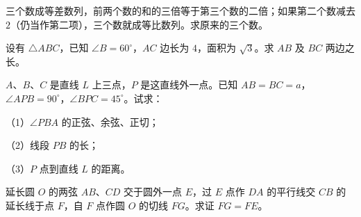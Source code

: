 \begin{question}
三个数成等差数列，前两个数的和的三倍等于第三个数的二倍；如果第二个数减去 $2$（仍当作第二项），三个数就成等比数列。求原来的三个数。

\end{question}
\begin{question}
设有 $\triangle ABC$，已知 $\angle B=60^\circ$，$AC$ 边长为 $4$，面积为 $\sqrt3$。求 $AB$ 及 $BC$ 两边之长。

\end{question}
\begin{question}
$A$、$B$、$C$ 是直线 $L$ 上三点，$P$ 是这直线外一点。已知 $AB=BC=a$，$\angle APB=90^\circ$，$\angle BPC=45^\circ$。试求：

（1）$\angle PBA$ 的正弦、余弦、正切；

（2）线段 $PB$ 的长；

（3）$P$ 点到直线 $L$ 的距离。

\Needspace{0.4\textheight}
\end{question}
\begin{question}
延长圆 $O$ 的两弦 $AB$、$CD$ 交于圆外一点 $E$，过 $E$ 点作 $DA$ 的平行线交 $CB$ 的延长线于点 $F$，自 $F$ 点作圆 $O$ 的切线 $FG$。求证 $FG=FE$。
\nopagebreak[4]
\begin{center}\end{center}
\nopagebreak[4]

\end{question}